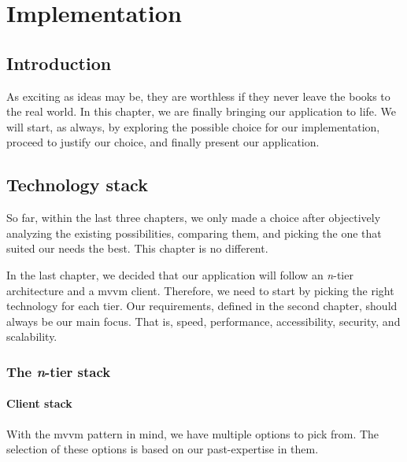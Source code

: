 \chapter{Implementation}
\label{chap:implementation}

\section{Introduction}

As exciting as ideas may be, they are worthless if they never leave the books to the real world.
In this chapter, we are finally bringing our application to life.
We will start, as always, by exploring the possible choice for our implementation, proceed to justify our choice, and finally present our application.

\section{Technology stack}

So far, within the last three chapters, we only made a choice after objectively analyzing the existing possibilities, comparing them, and picking the one that suited our needs the best.
This chapter is no different.

In the last chapter, we decided that our application will follow an \emph{n}-tier architecture and a \acrshort{mvvm} client.
Therefore, we need to start by picking the right technology for each tier.
Our requirements, defined in the second chapter, should always be our main focus.
That is, speed, performance, accessibility, security, and scalability.

\subsection{The \emph{n}-tier stack}
\subsubsection{Client stack}

With the \acrshort{mvvm} pattern in mind, we have multiple options to pick from.
The selection of these options is based on our past-expertise in them.


